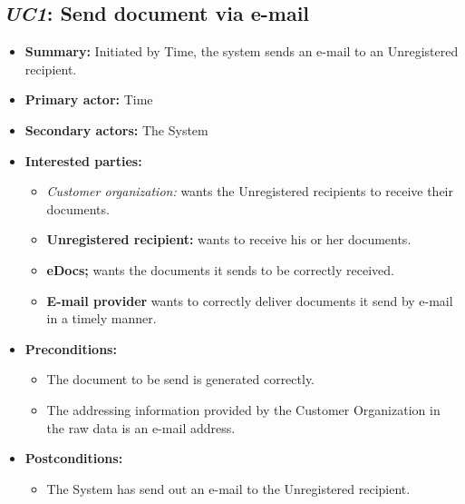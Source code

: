 \documentclass[a4paper,10pt]{article}
\begin{document}
\subsection{\emph{UC1}: Send document via e-mail}
\begin{itemize}
    \item \textbf{Summary:} Initiated by Time, the system sends an e-mail to an Unregistered recipient.
    \item \textbf{Primary actor:} Time
	\item \textbf{Secondary actors:} The System
    \item \textbf{Interested parties:} 
        \begin{itemize}
            \item \textit{Customer organization:} wants the Unregistered recipients to receive their documents.
            \item \textbf{Unregistered recipient:} wants to receive his or her documents.
            \item \textbf{eDocs;} wants the documents it sends to be correctly received.
            \item \textbf{E-mail provider} wants to correctly deliver documents it send by e-mail in a timely manner.
        \end{itemize}

    \item \textbf{Preconditions:}
        \begin{itemize}
            \item The document to be send is generated correctly.
            \item The addressing information provided by the Customer Organization in the raw data is an e-mail address.
        \end{itemize}

    \item \textbf{Postconditions:}
        \begin{itemize}
            \item The System has send out an e-mail to the Unregistered recipient.
        \end{itemize}
        

\end{itemize}
\end{document}
